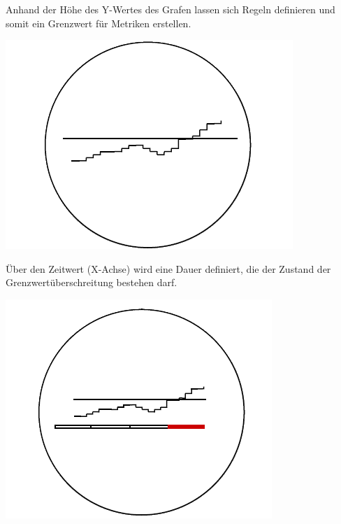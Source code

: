 \documentclass[a4paper,10pt]{scrartcl}
\begin{document}
Anhand der Höhe des Y-Wertes des Grafen lassen sich Regeln definieren und somit ein Grenzwert für Metriken erstellen.\\
\begin{minipage}{\linewidth}
  \includegraphics[scale=.3]{img/Datenaggregation/GrafYWertNew.png} 
\end{minipage}

Über den Zeitwert (X-Achse) wird eine Dauer definiert, die der Zustand der Grenzwertüberschreitung bestehen darf.\\
\begin{minipage}{\linewidth}
  \includegraphics[scale=.3]{img/Datenaggregation/GrafAlarmNew.png} 
\end{minipage}
\end{document}
